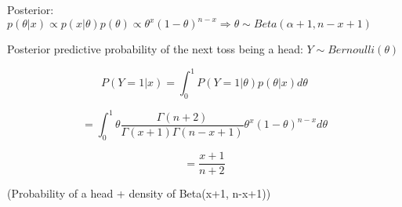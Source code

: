 \documentclass{article}
\begin{document}
Posterior: $p(\theta|x) \propto p(x|\theta)p(\theta) \propto \theta^x(1-\theta)^{n-x} \Rightarrow \theta \sim Beta(\alpha+1, n-x+1)$

Posterior predictive probability of the next toss being a head: $Y \sim Bernoulli(\theta)$

\[
P(Y=1|x) = \int_{0}^{1}P(Y=1|\theta)p(\theta|x)d\theta
\]

\[
= \int_{0}^{1} \theta \frac{\Gamma(n+2)}{\Gamma(x+1)\Gamma(n-x+1)}\theta^x(1-\theta)^{n-x}d\theta
\]

\[
= \frac{x+1}{n+2}
\]

(Probability of a head + density of Beta(x+1, n-x+1))
\end{document}
